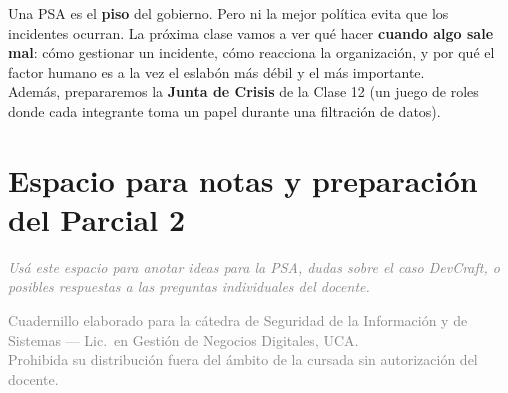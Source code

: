 \documentclass[12pt,a4paper]{article}
\begin{document}
\begin{cajaNota}[title={Puente hacia la Clase 12: Factor humano e incidentes}]
Una PSA es el \textbf{piso} del gobierno. Pero ni la mejor pol\'itica evita que los incidentes ocurran. La pr\'oxima clase vamos a ver qu\'e hacer \textbf{cuando algo sale mal}: c\'omo gestionar un incidente, c\'omo reacciona la organizaci\'on, y por qu\'e el factor humano es a la vez el eslab\'on m\'as d\'ebil y el m\'as importante.\\[4pt]
Adem\'as, prepararemos la \textbf{Junta de Crisis} de la Clase 12 (un juego de roles donde cada integrante toma un papel durante una filtraci\'on de datos).
\end{cajaNota}

\vspace{1cm}

\section{Espacio para notas y preparaci\'on del Parcial 2}

\begin{tcolorbox}[colback=grisClaro, colframe=gray!50, arc=2mm, height=7cm]
\textcolor{gray}{\itshape Us\'a este espacio para anotar ideas para la PSA, dudas sobre el caso DevCraft, o posibles respuestas a las preguntas individuales del docente.}
\end{tcolorbox}

\vfill
\begin{center}
\small\textcolor{gray}{%
Cuadernillo elaborado para la c\'atedra de Seguridad de la Informaci\'on y de
Sistemas --- Lic.\ en Gesti\'on de Negocios Digitales, UCA.\\
Prohibida su distribuci\'on fuera del \'ambito de la cursada sin autorizaci\'on del docente.}
\end{center}
\end{document}
